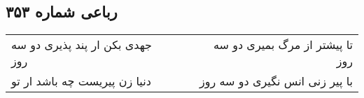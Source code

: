 \begin{center}
\section*{رباعی شماره ۳۵۳}
\label{sec:sh353}
\begin{longtable}{l p{0.5cm} r}
جهدی بکن ار پند پذیری دو سه روز
&&
تا پیشتر از مرگ بمیری دو سه روز
\\
دنیا زن پیریست چه باشد ار تو
&&
با پیر زنی انس نگیری دو سه روز
\\
\end{longtable}
\end{center}
